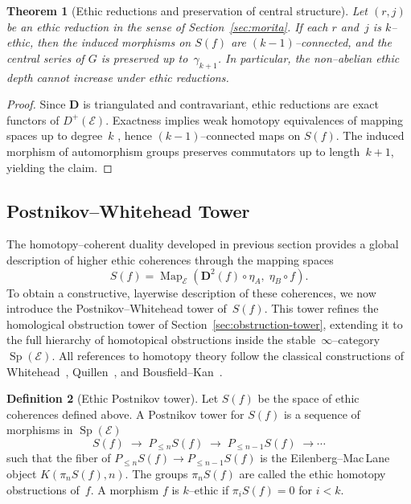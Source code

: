 \documentclass[12pt]{article}
\DeclareMathOperator{\Map}{Map}
\DeclareMathOperator{\Sp}{Sp}
\newcommand{\E}{\mathcal{E}}
\theoremstyle{plain}
\newtheorem{theorem}{Theorem}[section]
\theoremstyle{definition}
\newtheorem{definition}[theorem]{Definition}
\theoremstyle{remark}
\numberwithin{equation}{section}
\begin{document}
\begin{theorem}[Ethic reductions and preservation of central structure]\label{thm:reduction-central}
Let $(r,j)$ be an ethic reduction in the sense of Section~\ref{sec:morita}.  
If each $r$ and~$j$ is $k$--ethic, then the induced morphisms on $S(f)$ are $(k{-}1)$--connected, and the central series of $G$ is preserved up to~$\gamma_{k+1}$.  
In particular, the non--abelian ethic depth cannot increase under ethic reductions.
\end{theorem}

\begin{proof}
Since $\mathbf D$ is triangulated and contravariant, ethic reductions are exact functors of $D^+(\E)$.  
Exactness implies weak homotopy equivalences of mapping spaces up to degree~$k$ \cite{GelfandManin2003}, hence $(k{-}1)$--connected maps on $S(f)$.  
The induced morphism of automorphism groups preserves commutators up to length~$k{+}1$, yielding the claim.
\end{proof}

\subsection{Postnikov–Whitehead Tower}

The homotopy–coherent duality developed in previous section provides a global description of higher ethic coherences through the mapping spaces
\[
S(f)=\Map_{\E}(\mathbf D^2(f)\!\circ\!\eta_A,\;\eta_B\!\circ\!f).
\]
To obtain a constructive, layerwise description of these coherences, we now introduce the Postnikov–Whitehead tower of~$S(f)$.
This tower refines the homological obstruction tower of Section~\ref{sec:obstruction-tower}, extending it to the full hierarchy of homotopical obstructions inside the stable~$\infty$–category~$\Sp(\E)$.
All references to homotopy theory follow the classical constructions of Whitehead~\cite{Whitehead1949}, Quillen~\cite{Quillen1967}, and Bousfield--Kan~\cite{BousfieldKan1972}.

\begin{definition}[Ethic Postnikov tower]\label{def:postnikov-tower}
Let $S(f)$ be the space of ethic coherences defined above.  
A Postnikov tower for $S(f)$ is a sequence of morphisms in $\Sp(\E)$
\[
S(f)\;\longrightarrow\;P_{\le n}S(f)\;\longrightarrow\;P_{\le n-1}S(f)\;\longrightarrow\cdots
\]
such that the fiber of $P_{\le n}S(f)\to P_{\le n-1}S(f)$ is the Eilenberg–Mac\,Lane object
$K(\pi_nS(f),n)$.  
The groups $\pi_nS(f)$ are called the ethic homotopy obstructions of~$f$.
A morphism $f$ is $k$--ethic if $\pi_iS(f)=0$ for $i<k$.
\end{definition}
\end{document}
